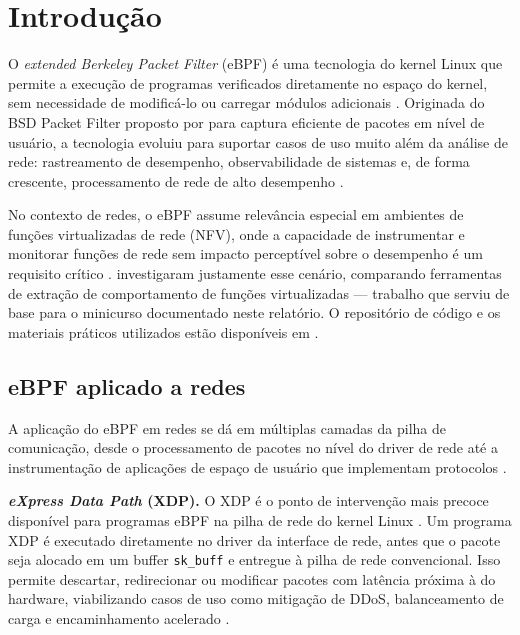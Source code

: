 \chapter{Introdução}

O \textit{extended Berkeley Packet Filter} (eBPF) é uma tecnologia do kernel Linux
que permite a execução de programas verificados diretamente no espaço do kernel,
sem necessidade de modificá-lo ou carregar módulos adicionais
\cite{linuxkernel2024}.
Originada do BSD Packet Filter proposto por  para captura
eficiente de pacotes em nível de usuário, a tecnologia evoluiu para suportar casos
de uso muito além da análise de rede: rastreamento de desempenho, observabilidade
de sistemas e, de forma crescente, processamento de rede de alto desempenho
\cite{gregg2019}.

No contexto de redes, o eBPF assume relevância especial em ambientes de funções
virtualizadas de rede (NFV), onde a capacidade de instrumentar e monitorar funções
de rede sem impacto perceptível sobre o desempenho é um requisito crítico
\cite{etsi2014}.
 investigaram justamente esse cenário, comparando
ferramentas de extração de comportamento de funções virtualizadas --- trabalho que
serviu de base para o minicurso documentado neste relatório.
O repositório de código e os materiais práticos utilizados estão disponíveis em
.

\section{eBPF aplicado a redes}

A aplicação do eBPF em redes se dá em múltiplas camadas da pilha de comunicação,
desde o processamento de pacotes no nível do driver de rede até a instrumentação
de aplicações de espaço de usuário que implementam protocolos \cite{linuxkernel2024}.

\textbf{\textit{eXpress Data Path} (XDP).}
O XDP é o ponto de intervenção mais precoce disponível para programas eBPF na
pilha de rede do kernel Linux \cite{linuxkernel2024}.
Um programa XDP é executado diretamente no driver da interface de rede, antes que
o pacote seja alocado em um buffer \texttt{sk\_buff} e entregue à pilha de rede
convencional.
Isso permite descartar, redirecionar ou modificar pacotes com latência próxima à
do hardware, viabilizando casos de uso como mitigação de DDoS, balanceamento de
carga e encaminhamento acelerado \cite{gregg2019}.

